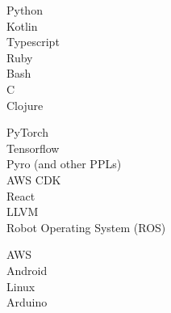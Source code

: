 \documentclass[9pt]{developercv} %
\newcommand{\CPP}
{C\nolinebreak[4]\hspace{-.05em}\raisebox{.22ex}{++ }}
\begin{document}
\begin{minipage}[t]{0.3\textwidth}
    \vspace{-\baselineskip} %


    Python\\
    Kotlin\\
    Typescript\\
    Ruby\\
    Bash\\
    \CPP \\
    Clojure
\end{minipage}
\hfill
\begin{minipage}[t]{0.3\textwidth}
    \vspace{-\baselineskip} %
    
    
    PyTorch \\
    Tensorflow \\
    Pyro (and other PPLs) \\
    AWS CDK \\
    React \\
    LLVM \\ 
    Robot Operating System (ROS)
\end{minipage}
\hfill
\begin{minipage}[t]{0.3\textwidth}
    \vspace{-\baselineskip} %
    
    
    AWS \\
    Android \\
    Linux \\
    Arduino
\end{minipage}

\vspace{.25cm}

\end{document}
